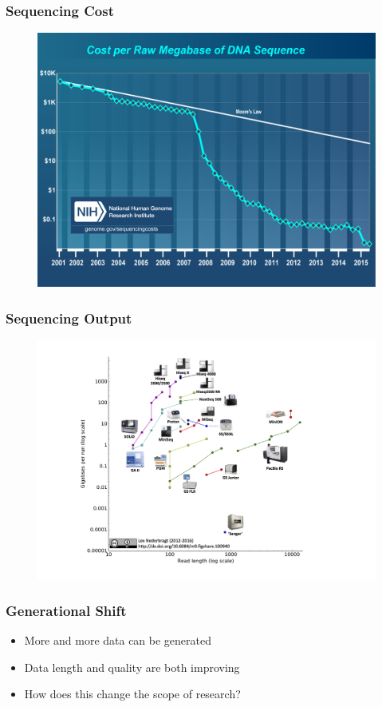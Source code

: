 \documentclass[14pt]{beamer}
\begin{document}
\begin{frame}
\frametitle{Sequencing Cost}
\begin{figure}
\includegraphics[width=0.8\linewidth]{images_20170829_NGS_cost.jpg}
\end{figure}
\end{frame}

\begin{frame}
\frametitle{Sequencing Output}
\begin{figure}
\includegraphics[width=0.8\linewidth]{images_20170829_machine_output.jpg}
\end{figure}
\end{frame}

\begin{frame}
\frametitle{Generational Shift}
\begin{itemize}
	\item<1-> More and more data can be generated
	\item<2-> Data length and quality are both improving
	\item<3-> How does this change the scope of research?
\end{itemize}
\end{frame}
\end{document}
